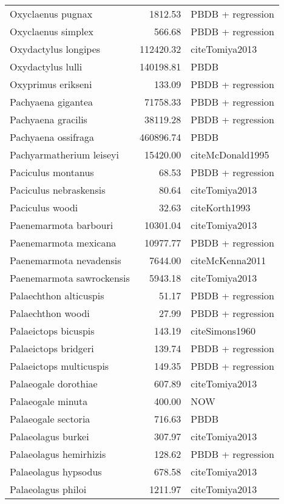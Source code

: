 \begin{table}[ht]
\begin{tabular}{lrl}
  Oxyclaenus pugnax & 1812.53 & PBDB + regression \\ 
  Oxyclaenus simplex & 566.68 & PBDB + regression \\ 
  Oxydactylus longipes & 112420.32 & cite{Tomiya2013} \\ 
  Oxydactylus lulli & 140198.81 & PBDB \\ 
  Oxyprimus erikseni & 133.09 & PBDB + regression \\ 
  Pachyaena gigantea & 71758.33 & PBDB + regression \\ 
  Pachyaena gracilis & 38119.28 & PBDB + regression \\ 
  Pachyaena ossifraga & 460896.74 & PBDB \\ 
  Pachyarmatherium leiseyi & 15420.00 & cite{McDonald1995} \\ 
  Paciculus montanus & 68.53 & PBDB + regression \\ 
  Paciculus nebraskensis & 80.64 & cite{Tomiya2013} \\ 
  Paciculus woodi & 32.63 & cite{Korth1993} \\ 
  Paenemarmota barbouri & 10301.04 & cite{Tomiya2013} \\ 
  Paenemarmota mexicana & 10977.77 & PBDB + regression \\ 
  Paenemarmota nevadensis & 7644.00 & cite{McKenna2011} \\ 
  Paenemarmota sawrockensis & 5943.18 & cite{Tomiya2013} \\ 
  Palaechthon alticuspis & 51.17 & PBDB + regression \\ 
  Palaechthon woodi & 27.99 & PBDB + regression \\ 
  Palaeictops bicuspis & 143.19 & cite{Simons1960} \\ 
  Palaeictops bridgeri & 139.74 & PBDB + regression \\ 
  Palaeictops multicuspis & 149.35 & PBDB + regression \\ 
  Palaeogale dorothiae & 607.89 & cite{Tomiya2013} \\ 
  Palaeogale minuta & 400.00 & NOW \\ 
  Palaeogale sectoria & 716.63 & PBDB \\ 
  Palaeolagus burkei & 307.97 & cite{Tomiya2013} \\ 
  Palaeolagus hemirhizis & 128.62 & PBDB + regression \\ 
  Palaeolagus hypsodus & 678.58 & cite{Tomiya2013} \\ 
  Palaeolagus philoi & 1211.97 & cite{Tomiya2013} \\ 

\end{tabular}
\end{table}
